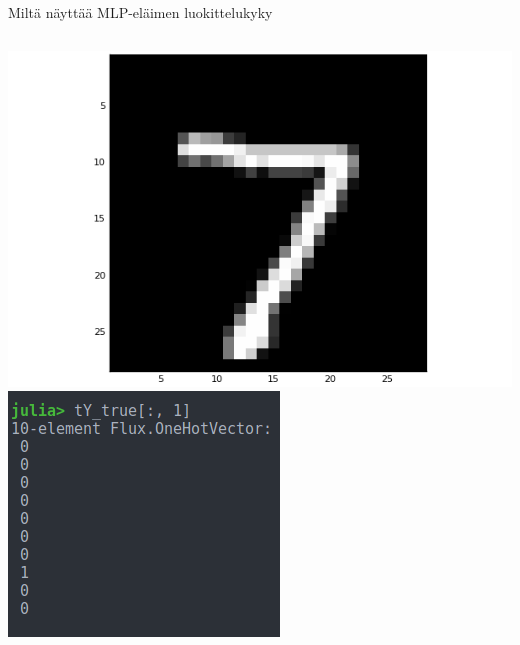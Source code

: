 \documentclass[presentation]{beamer}
\begin{document}
\begin{frame}{Miltä näyttää MLP-eläimen luokittelukyky}


    \begin{columns}[]
			\includegraphics[width=\textwidth]{mnist1_7.png}
			\centering
				\includegraphics[width=\textwidth]{mnist_tst1_true.png}


\end{columns}
\end{frame}
\end{document}
